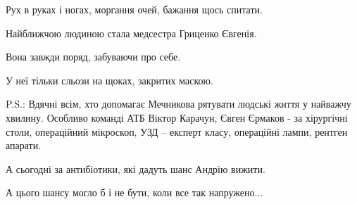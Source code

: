 Рух в руках і ногах, моргання очей, бажання щось спитати. 

Найближчою людиною стала медсестра Гриценко Євгенія. 

Вона завжди поряд, забуваючи про себе.  

У неї тільки сльози на щоках, закритих маскою.

P.S.: Вдячні всім, хто допомагає Мечникова рятувати людські життя у найважчу
хвилину.  Особливо команді АТБ Віктор Карачун, Євген Єрмаков - за хірургічні
столи, операційний мікроскоп, УЗД – експерт класу, операційні лампи, рентген
апарати.

А сьогодні за антибіотики, які дадуть шанс Андрію вижити. 

А цього шансу могло б і не бути, коли все так напружено...

